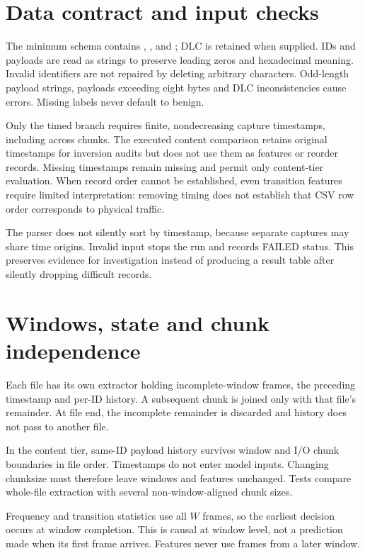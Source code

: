 \documentclass[12pt,a4paper,oneside,openany]{extbook}
\DeclareRobustCommand{\code}[1]{\texttt{\detokenize{#1}}}
\begin{document}
\section{Data contract and input checks}
The minimum schema contains \code{timestamp}, \code{arbitration_id}, \code{data_field} and \code{attack}; DLC is retained when supplied. IDs and payloads are read as strings to preserve leading zeros and hexadecimal meaning. Invalid identifiers are not repaired by deleting arbitrary characters. Odd-length payload strings, payloads exceeding eight bytes and DLC inconsistencies cause errors. Missing labels never default to benign.

Only the timed branch requires finite, nondecreasing capture timestamps, including across chunks. The executed content comparison retains original timestamps for inversion audits but does not use them as features or reorder records. Missing timestamps remain missing and permit only content-tier evaluation. When record order cannot be established, even transition features require limited interpretation: removing timing does not establish that CSV row order corresponds to physical traffic.

The parser does not silently sort by timestamp, because separate captures may share time origins. Invalid input stops the run and records FAILED status. This preserves evidence for investigation instead of producing a result table after silently dropping difficult records.

\section{Windows, state and chunk independence}
Each file has its own extractor holding incomplete-window frames, the preceding timestamp and per-ID history. A subsequent chunk is joined only with that file's remainder. At file end, the incomplete remainder is discarded and history does not pass to another file.

In the content tier, same-ID payload history survives window and I/O chunk boundaries in file order. Timestamps do not enter model inputs. Changing chunksize must therefore leave windows and features unchanged. Tests compare whole-file extraction with several non-window-aligned chunk sizes.

Frequency and transition statistics use all $W$ frames, so the earliest decision occurs at window completion. This is causal at window level, not a prediction made when its first frame arrives. Features never use frames from a later window.
\end{document}
